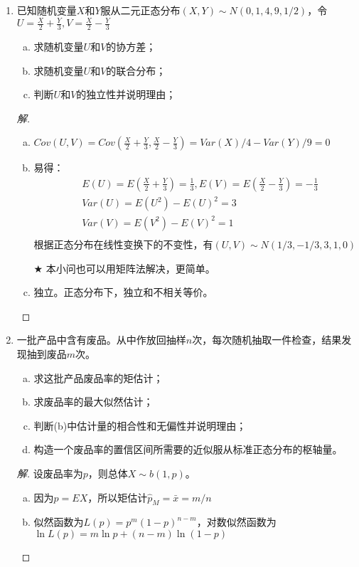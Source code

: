 \documentclass[12pt]{article}
\newcommand{\hei}{\CJKfamily{hei}}                          %
\begin{document}
\begin{enumerate}
\item {\hei 已知随机变量$X$和$Y$服从二元正态分布$(X,Y)\sim N(0,1,4,9,1/2)$，令$U=\frac{X}{2}+\frac{Y}{3},V=\frac{X}{2}-\frac{Y}{3}$
\begin{enumerate}[(a)]
	\item 求随机变量$U$和$V$的协方差；
	\item 求随机变量$U$和$V$的联合分布；
	\item 判断$U$和$V$的独立性并说明理由；
\end{enumerate}}
\begin{proof}[解]
	\begin{enumerate}[(a)]
		\item $Cov(U,V)=Cov(\frac{X}{2}+\frac{Y}{3},\frac{X}{2}-\frac{Y}{3})=Var(X)/4-Var(Y)/9=0$
		\item 易得：\begin{equation*}
		\begin{aligned}
		&E(U)=E(\frac{X}{2}+\frac{Y}{3})=\frac{1}{3},E(V)=E(\frac{X}{2}-\frac{Y}{3})=-\frac{1}{3} \\
		&Var(U)=E(U^2)-E(U)^2=3 \\
		&Var(V)=E(V^2)-E(V)^2=1 \\
		\end{aligned}
		\end{equation*}
		根据正态分布在线性变换下的不变性，有$(U,V)\sim N(1/3,-1/3,3,1,0)$
		
		{\hei $\bigstar$ 本小问也可以用矩阵法解决，更简单。}
		\item 独立。正态分布下，独立和不相关等价。
	\end{enumerate}
\end{proof}

\item {\hei 一批产品中含有废品。从中作放回抽样$n$次，每次随机抽取一件检查，结果发现抽到废品$m$次。
\begin{enumerate}[(a)]
	\item 求这批产品废品率的矩估计；
	\item\label{b} 求废品率的最大似然估计；
	\item 判断(b)中估计量的相合性和无偏性并说明理由；
	\item 构造一个废品率的置信区间所需要的近似服从标准正态分布的枢轴量。
\end{enumerate}}
\begin{proof}[解]
	设废品率为$p$，则总体$X\sim b(1,p)$。
	\begin{enumerate}[(a)]
		\item 因为$p=EX$，所以矩估计$\hat{p}_M=\bar{x}=m/n$
		\item 似然函数为$L(p)=p^m(1-p)^{n-m}$，对数似然函数为$\ln L(p)=m\ln p+(n-m)\ln (1-p)$
		

\end{enumerate}
\end{proof}
\end{enumerate}
\end{document}
